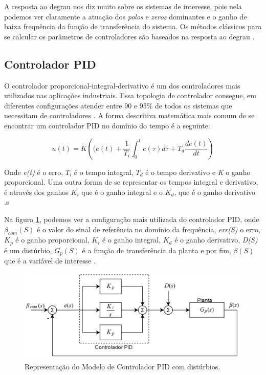 A resposta ao degrau nos diz muito sobre os sistemas de interesse, pois nela podemos ver claramente a atuação dos \textit{polos} e \textit{zeros} dominantes e o ganho de baixa frequência da função de transferência do sistema. Os métodos clássicos para se calcular os parâmetros de controladores são baseados na resposta ao degrau \cite{Ogata}. 



\subsection{Controlador PID}

O controlador proporcional-integral-derivativo é um dos controladores mais utilizados nas aplicações industriais. Essa topologia de controlador consegue, em diferentes configurações atender entre 90 e 95\% de todos os sistemas que necessitam de controladores \cite{Levine1996}. A forma descritiva matemática mais comum de se encontrar um controlador PID no domínio do tempo é a seguinte:

\begin{equation}\label{eq:PID}
  u(t) = K\left((e(t)+\frac{1}{T_i}\int_{0}^{t}{e(\tau)}d\tau+T_d\frac{de(t)}{dt}\right) 
\end{equation}

Onde \textit{e(t)} é o erro, \textit{$T_i$} é o tempo integral, \textit{$T_d$} é o tempo derivativo e \textit{K} o ganho proporcional. Uma outra forma de se representar os tempos integral e derivativo, é através dos ganhos \textit{$K_i$} que é o ganho integral e o \textit{$K_d$}, que é o ganho derivativo \cite{Astrom1995}.s

Na figura \ref{fig:pid_controller_Snider_p35}, podemos ver a configuração mais utilizada do controlador PID, onde $\beta_{com}(S)$ é o valor do sinal de referência no domínio da frequência, \textit{err(S)} o erro, \textit{$K_p$} é o ganho proporcional, \textit{$K_i$} é o ganho integral, \textit{$K_d$} é o ganho derivativo, \textit{D(S)} é um distúrbio, \textit{$G_p(S)$} é a função de transferência da planta e por fim, \textit{$\beta(S)$} que é a variável de interesse \cite{Snider}.

\begin{figure}[H]
  \caption{Representação do Modelo de Controlador PID com distúrbios.}
  \begin{center}
      \includegraphics[scale=0.55]{referencial/img/pid_controller_Snider_p35}
  \end{center}
  \label{fig:pid_controller_Snider_p35}
\end{figure}

